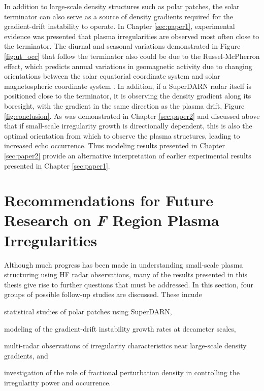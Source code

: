 In addition to large-scale density structures such as polar patches, the solar terminator can also serve as a source of density gradients required for the gradient-drift instability to operate.  In Chapter \ref{sec:paper1}, experimental evidence was presented that plasma irregularities are observed most often close to the terminator.  The diurnal and seasonal variations demonstrated in Figure \ref{fig:ut_occ} that follow the terminator also could be due to the Russel-McPherron effect, which predicts annual variations in geomagnetic activity due to changing orientations between the solar equatorial coordinate system and solar magnetospheric coordinate system \citep{Russell1973,Zhao2012}.  In addition, if a SuperDARN radar itself is positioned close to the terminator, it is observing the density gradient along its boresight, with the gradient in the same direction as the plasma drift, Figure \ref{fig:conclusion}.  As was demonstrated in Chapter \ref{sec:paper2} and discussed above that if small-scale irregularity growth is directionally dependent, this is also the optimal orientation from which to observe the plasma structures, leading to increased echo occurrence.  Thus modeling results presented in Chapter \ref{sec:paper2} provide an alternative interpretation of earlier experimental results presented in Chapter \ref{sec:paper1}.



\section{Recommendations for Future Research on \textit{F} Region Plasma Irregularities}
\label{sec:futurework}

Although much progress has been made in understanding small-scale plasma structuring using HF radar observations, many of the results presented in this thesis give rise to further questions that must be addressed.  In this section, four groups of possible follow-up studies are discussed.  These incude 
\begin{enumerate*}[label={(\arabic*)}] 
	\item statistical studies of polar patches using SuperDARN, 
	\item modeling of the gradient-drift instability growth rates at decameter scales, 
	\item multi-radar observations of irregularity characteristics near large-scale density gradients, and 
	\item investigation of the role of fractional perturbation density in controlling the irregularity power and occurrence.
\end{enumerate*}

